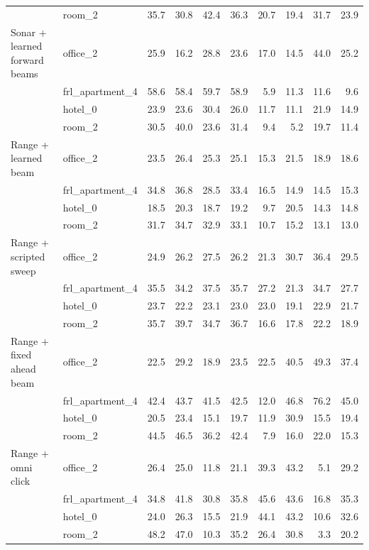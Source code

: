 \begin{tabular}{llrrrrrrrr}
 & room\_2 & 35.7 & 30.8 & 42.4 & 36.3 & 20.7 & 19.4 & 31.7 & 23.9 \\
\addlinespace
Sonar + learned forward beams & office\_2 & 25.9 & 16.2 & 28.8 & 23.6 & 17.0 & 14.5 & 44.0 & 25.2 \\
 & frl\_apartment\_4 & 58.6 & 58.4 & 59.7 & 58.9 & 5.9 & 11.3 & 11.6 & 9.6 \\
 & hotel\_0 & 23.9 & 23.6 & 30.4 & 26.0 & 11.7 & 11.1 & 21.9 & 14.9 \\
 & room\_2 & 30.5 & 40.0 & 23.6 & 31.4 & 9.4 & 5.2 & 19.7 & 11.4 \\
\addlinespace
Range + learned beam & office\_2 & 23.5 & 26.4 & 25.3 & 25.1 & 15.3 & 21.5 & 18.9 & 18.6 \\
 & frl\_apartment\_4 & 34.8 & 36.8 & 28.5 & 33.4 & 16.5 & 14.9 & 14.5 & 15.3 \\
 & hotel\_0 & 18.5 & 20.3 & 18.7 & 19.2 & 9.7 & 20.5 & 14.3 & 14.8 \\
 & room\_2 & 31.7 & 34.7 & 32.9 & 33.1 & 10.7 & 15.2 & 13.1 & 13.0 \\
\addlinespace
Range + scripted sweep & office\_2 & 24.9 & 26.2 & 27.5 & 26.2 & 21.3 & 30.7 & 36.4 & 29.5 \\
 & frl\_apartment\_4 & 35.5 & 34.2 & 37.5 & 35.7 & 27.2 & 21.3 & 34.7 & 27.7 \\
 & hotel\_0 & 23.7 & 22.2 & 23.1 & 23.0 & 23.0 & 19.1 & 22.9 & 21.7 \\
 & room\_2 & 35.7 & 39.7 & 34.7 & 36.7 & 16.6 & 17.8 & 22.2 & 18.9 \\
\addlinespace
Range + fixed ahead beam & office\_2 & 22.5 & 29.2 & 18.9 & 23.5 & 22.5 & 40.5 & 49.3 & 37.4 \\
 & frl\_apartment\_4 & 42.4 & 43.7 & 41.5 & 42.5 & 12.0 & 46.8 & 76.2 & 45.0 \\
 & hotel\_0 & 20.5 & 23.4 & 15.1 & 19.7 & 11.9 & 30.9 & 15.5 & 19.4 \\
 & room\_2 & 44.5 & 46.5 & 36.2 & 42.4 & 7.9 & 16.0 & 22.0 & 15.3 \\
\addlinespace
Range + omni click & office\_2 & 26.4 & 25.0 & 11.8 & 21.1 & 39.3 & 43.2 & 5.1 & 29.2 \\
 & frl\_apartment\_4 & 34.8 & 41.8 & 30.8 & 35.8 & 45.6 & 43.6 & 16.8 & 35.3 \\
 & hotel\_0 & 24.0 & 26.3 & 15.5 & 21.9 & 44.1 & 43.2 & 10.6 & 32.6 \\
 & room\_2 & 48.2 & 47.0 & 10.3 & 35.2 & 26.4 & 30.8 & 3.3 & 20.2 \\
\bottomrule
\end{tabular}
